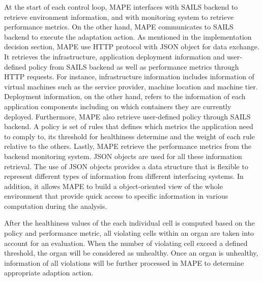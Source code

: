 \documentclass{seal_thesis}
\begin{document}
At the start of each control loop, MAPE interfaces with SAILS backend to retrieve environment information, and with monitoring system to retrieve performance metrics. On the other hand, MAPE communicates to SAILS backend to execute the adaptation action.
As mentioned in the implementation decision section, MAPE use HTTP protocol with JSON object for data exchange.
It retrieves the infrastructure, application deployment information and user-defined policy from SAILS backend as well as performance metrics through HTTP requests.
For instance, infrastructure information includes information of virtual machines such as the service provider, machine location and machine tier. Deployment information, on the other hand, refers to the information of each application components including on which containers they are currently deployed.
Furthermore, MAPE also retrieve user-defined policy through SAILS backend. A policy is set of rules that defines which metrics the application need to comply to, its threshold for healthiness determine and the weight of each rule relative to the others.
Lastly, MAPE retrieve the performance metrics from the backend monitoring system.
JSON objects are used for all these information retrieval.
The use of JSON objects provides a data structure that is flexible to represent different types of information from different interfacing systems.
In addition, it allows MAPE to build a object-oriented view of the whole environment that provide quick access to specific information in various computation during the analysis.


After the healthiness values of the each individual cell is computed based on the policy and performance metric, all violating cells within an organ are taken into account for an evaluation.
When the number of violating cell exceed a defined threshold, the organ will be considered as unhealthy.
Once an organ is unhealthy, information of all violations will be further processed in MAPE to determine appropriate adaption action.
\end{document}
